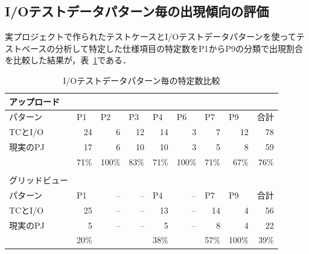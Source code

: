 \subsection{I/Oテストデータパターン毎の出現傾向の評価}
実プロジェクトで作られたテストケースとI/Oテストデータパターンを使ってテストベースの分析して特定した仕様項目の特定数をP1からP9の分類で出現割合を比較した結果が，表~\ref{tab:D-4-IOtestcompare}である．
\begin{table}[htbp]
  \centering
  \caption{I/Oテストデータパターン毎の特定数比較}
    \begin{tabular}{rrrrrrrrr}
    \multicolumn{1}{l}{アップロード} &  &     &       &       &       &       &       &  \bigstrut[b]\\
    \hline
    \multicolumn{1}{|l|}{パターン} &\multicolumn{1}{|l|}{P1} & \multicolumn{1}{l|}{P2} & \multicolumn{1}{l|}{P3} & \multicolumn{1}{l|}{P4} & \multicolumn{1}{l|}{P6} & \multicolumn{1}{l|}{P7} & \multicolumn{1}{l|}{P9} & \multicolumn{1}{l|}{合計} \bigstrut\\
    \hline
    \hline
    \multicolumn{1}{|l|}{TCとI/O} &\multicolumn{1}{|r|}{24} & \multicolumn{1}{r|}{6} & \multicolumn{1}{r|}{12} & \multicolumn{1}{r|}{14} & \multicolumn{1}{r|}{3} & \multicolumn{1}{r|}{7} & \multicolumn{1}{r|}{12} & \multicolumn{1}{r|}{78} \bigstrut\\
    \hline
    \multicolumn{1}{|l|}{現実のPJ} &\multicolumn{1}{|r|}{17} & \multicolumn{1}{r|}{6} & \multicolumn{1}{r|}{10} & \multicolumn{1}{r|}{10} & \multicolumn{1}{r|}{3} & \multicolumn{1}{r|}{5} & \multicolumn{1}{r|}{8} & \multicolumn{1}{r|}{59} \bigstrut\\
    \hline
    &71\%  & 100\% & 83\%  & 71\%  & 100\% & 71\%  & 67\%  & 76\% \bigstrut[t]\\
          &       &       &       &       &       &       &  \\
    \multicolumn{1}{l}{グリッドビュー}  & &       &       &       &       &       &       &  \bigstrut[b]\\
    \hline
    \multicolumn{1}{|l|}{パターン} &\multicolumn{1}{|l|}{P1} & \multicolumn{1}{r|}{--} & \multicolumn{1}{r|}{--} & \multicolumn{1}{l|}{P4} & \multicolumn{1}{r|}{--} & \multicolumn{1}{l|}{P7} & \multicolumn{1}{l|}{P9} & \multicolumn{1}{l|}{合計} \bigstrut\\
    \hline
    \hline
    \multicolumn{1}{|l|}{TCとI/O} &\multicolumn{1}{|r|}{25} & \multicolumn{1}{r|}{--} & \multicolumn{1}{r|}{--} & \multicolumn{1}{r|}{13} & \multicolumn{1}{r|}{--} & \multicolumn{1}{r|}{14} & \multicolumn{1}{r|}{4} & \multicolumn{1}{r|}{56} \bigstrut\\
    \hline
    \multicolumn{1}{|l|}{現実のPJ} &\multicolumn{1}{|r|}{5} & \multicolumn{1}{r|}{--} & \multicolumn{1}{r|}{--} & \multicolumn{1}{r|}{5} & \multicolumn{1}{r|}{--} & \multicolumn{1}{r|}{8} & \multicolumn{1}{r|}{4} & \multicolumn{1}{r|}{22} \bigstrut\\
    \hline
    &20\%  &       &       & 38\%  &       & 57\%  & 100\% & 39\% \bigstrut[t]\\
    \end{tabular}%
  \label{tab:D-4-IOtestcompare}%
\end{table}%

